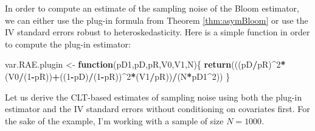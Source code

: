 \documentclass[]{book}
\newenvironment{Shaded}{\begin{snugshade}}{\end{snugshade}}
\newcommand{\KeywordTok}[1]{\textcolor[rgb]{0.13,0.29,0.53}{\textbf{#1}}}
\newcommand{\DecValTok}[1]{\textcolor[rgb]{0.00,0.00,0.81}{#1}}
\newcommand{\StringTok}[1]{\textcolor[rgb]{0.31,0.60,0.02}{#1}}
\newcommand{\ControlFlowTok}[1]{\textcolor[rgb]{0.13,0.29,0.53}{\textbf{#1}}}
\newcommand{\OperatorTok}[1]{\textcolor[rgb]{0.81,0.36,0.00}{\textbf{#1}}}
\newcommand{\NormalTok}[1]{#1}
\theoremstyle{definition}
\theoremstyle{definition}
\theoremstyle{definition}
\theoremstyle{remark}
\let\BeginKnitrBlock\begin \let\EndKnitrBlock\end
\begin{document}
\BeginKnitrBlock{remark}
\iffalse{} {Remark. } \fi{}In order to compute an estimate of the
sampling noise of the Bloom estimator, we can either use the plug-in
formula from Theorem \ref{thm:asymBloom} or use the IV standard errors
robust to heteroskedasticity. Here is a simple function in order to
compute the plug-in estimator:
\EndKnitrBlock{remark}

\begin{Shaded}
\begin{Highlighting}[]
\NormalTok{var.RAE.plugin <-}\StringTok{ }\ControlFlowTok{function}\NormalTok{(pD1,pD,pR,V0,V1,N)\{}
  \KeywordTok{return}\NormalTok{(((pD}\OperatorTok{/}\NormalTok{pR)}\OperatorTok{^}\DecValTok{2}\OperatorTok{*}\NormalTok{(V0}\OperatorTok{/}\NormalTok{(}\DecValTok{1}\OperatorTok{-}\NormalTok{pR))}\OperatorTok{+}\NormalTok{((}\DecValTok{1}\OperatorTok{-}\NormalTok{pD)}\OperatorTok{/}\NormalTok{(}\DecValTok{1}\OperatorTok{-}\NormalTok{pR))}\OperatorTok{^}\DecValTok{2}\OperatorTok{*}\NormalTok{(V1}\OperatorTok{/}\NormalTok{pR))}\OperatorTok{/}\NormalTok{(N}\OperatorTok{*}\NormalTok{pD1}\OperatorTok{^}\DecValTok{2}\NormalTok{))}
\NormalTok{\}}
\end{Highlighting}
\end{Shaded}

\BeginKnitrBlock{example}
\protect\hypertarget{exm:unnamed-chunk-104}{}{\label{exm:unnamed-chunk-104}
}Let us derive the CLT-based estimates of sampling noise using both the
plug-in estimator and the IV standard errors without conditioning on
covariates first. For the sake of the example, I'm working with a sample
of size \(N=1000\).
\EndKnitrBlock{example}
\end{document}
